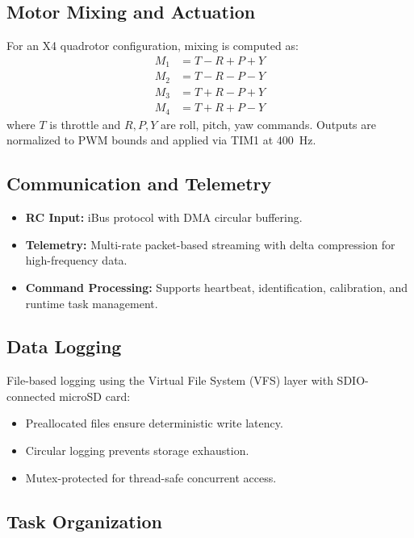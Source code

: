 \documentclass[11pt]{article}
\begin{document}
\subsection{Motor Mixing and Actuation}

For an X4 quadrotor configuration, mixing is computed as:
\begin{align*}
M_1 &= T - R + P + Y \\
M_2 &= T - R - P - Y \\
M_3 &= T + R - P + Y \\
M_4 &= T + R + P - Y
\end{align*}
where $T$ is throttle and $R,P,Y$ are roll, pitch, yaw commands. Outputs are normalized to PWM bounds and applied via TIM1 at 400~Hz.

\subsection{Communication and Telemetry}

\begin{itemize}[leftmargin=*]
    \item \textbf{RC Input:} iBus protocol with DMA circular buffering.
    \item \textbf{Telemetry:} Multi-rate packet-based streaming with delta compression for high-frequency data.
    \item \textbf{Command Processing:} Supports heartbeat, identification, calibration, and runtime task management.
\end{itemize}

\subsection{Data Logging}

File-based logging using the Virtual File System (VFS) layer with SDIO-connected microSD card:
\begin{itemize}[leftmargin=*]
    \item Preallocated files ensure deterministic write latency.
    \item Circular logging prevents storage exhaustion.
    \item Mutex-protected for thread-safe concurrent access.
\end{itemize}

\subsection{Task Organization}
\end{document}
